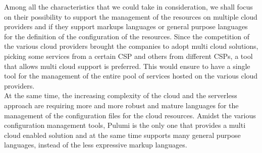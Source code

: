 Among all the characteristics that we could take in consideration, we shall focus on their possibility to support the management of the resources on multiple cloud providers and if they support markups languages or general purpose languages for the definition of the configuration of the resources.
Since the competition of the various cloud providers brought the companies to adopt multi cloud solutions, picking some services from a certain CSP and others from different CSPs, a tool that allows multi cloud support is preferred.
This would ensure to have a single tool for the management of the entire pool of services hosted on the various cloud providers.\\
At the same time, the increasing complexity of the cloud and the serverless approach are requiring more and more robust and mature languages for the management of the configuration files for the cloud resources.
Amidst the various configuration management tools, Pulumi is the only one that provides a multi cloud enabled solution and at the same time supports many general purpose languages, instead of the less expressive markup languages.\\


